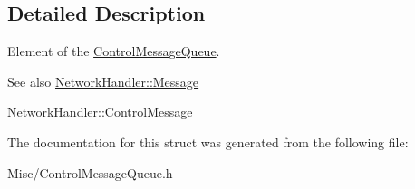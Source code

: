 \subsection{Detailed Description}
Element of the \mbox{\hyperlink{classControlMessageQueue}{Control\+Message\+Queue}}. 

\begin{DoxySeeAlso}{See also}
\mbox{\hyperlink{structNetworkHandler_1_1Message}{Network\+Handler\+::\+Message}} 

\mbox{\hyperlink{structNetworkHandler_1_1ControlMessage}{Network\+Handler\+::\+Control\+Message}} 
\end{DoxySeeAlso}


The documentation for this struct was generated from the following file\+:\begin{DoxyCompactItemize}
\item 
Misc/Control\+Message\+Queue.\+h\end{DoxyCompactItemize}
